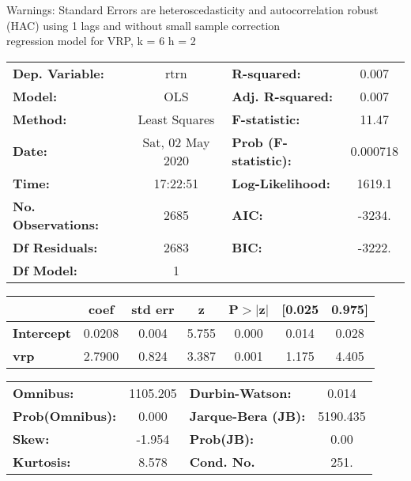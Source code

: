Warnings: \newline
 [1] Standard Errors are heteroscedasticity and autocorrelation robust (HAC) using 1 lags and without small sample correction\\ 

regression model for VRP, k = 6 h = 2\begin{center}
\begin{tabular}{lclc}
\toprule
\textbf{Dep. Variable:}    &       rtrn       & \textbf{  R-squared:         } &     0.007   \\
\textbf{Model:}            &       OLS        & \textbf{  Adj. R-squared:    } &     0.007   \\
\textbf{Method:}           &  Least Squares   & \textbf{  F-statistic:       } &     11.47   \\
\textbf{Date:}             & Sat, 02 May 2020 & \textbf{  Prob (F-statistic):} &  0.000718   \\
\textbf{Time:}             &     17:22:51     & \textbf{  Log-Likelihood:    } &    1619.1   \\
\textbf{No. Observations:} &        2685      & \textbf{  AIC:               } &    -3234.   \\
\textbf{Df Residuals:}     &        2683      & \textbf{  BIC:               } &    -3222.   \\
\textbf{Df Model:}         &           1      & \textbf{                     } &             \\
\bottomrule
\end{tabular}
\begin{tabular}{lcccccc}
                   & \textbf{coef} & \textbf{std err} & \textbf{z} & \textbf{P$> |$z$|$} & \textbf{[0.025} & \textbf{0.975]}  \\
\midrule
\textbf{Intercept} &       0.0208  &        0.004     &     5.755  &         0.000        &        0.014    &        0.028     \\
\textbf{vrp}       &       2.7900  &        0.824     &     3.387  &         0.001        &        1.175    &        4.405     \\
\bottomrule
\end{tabular}
\begin{tabular}{lclc}
\textbf{Omnibus:}       & 1105.205 & \textbf{  Durbin-Watson:     } &    0.014  \\
\textbf{Prob(Omnibus):} &   0.000  & \textbf{  Jarque-Bera (JB):  } & 5190.435  \\
\textbf{Skew:}          &  -1.954  & \textbf{  Prob(JB):          } &     0.00  \\
\textbf{Kurtosis:}      &   8.578  & \textbf{  Cond. No.          } &     251.  \\
\bottomrule
\end{tabular}
\end{center}

